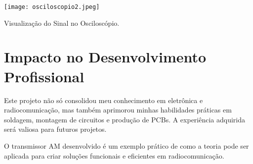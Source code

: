 \documentclass[
]{book}
\begin{document}
\texttt{[image: osciloscopio2.jpeg]}

Visualização do Sinal no Osciloscópio.

\section{Impacto no Desenvolvimento Profissional}\label{impacto-no-desenvolvimento-profissional}

Este projeto não só consolidou meu conhecimento em eletrônica e radiocomunicação, mas também aprimorou minhas habilidades práticas em soldagem, montagem de circuitos e produção de PCBs. A experiência adquirida será valiosa para futuros projetos.

O transmissor AM desenvolvido é um exemplo prático de como a teoria pode ser aplicada para criar soluções funcionais e eficientes em radiocomunicação.

  
\end{document}

